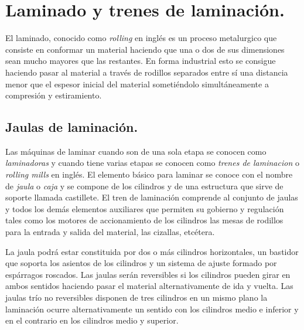 
\chapter{Laminado y trenes de laminación.} %

\label{AppendixLaminacionYTrenes} %



El laminado, conocido como \textit{rolling} en inglés es un proceso metalurgico que consiste en conformar un material haciendo que una o dos de sus dimensiones sean mucho mayores que las restantes. En forma industrial esto se consigue haciendo pasar al material a través de  rodillos separados entre sí una distancia menor que el espesor inicial del material sometiéndolo simultáneamente a compresión y estiramiento. 


\section{Jaulas de laminación.}

Las máquinas de laminar cuando son de una sola etapa se conocen como \emph{laminadoras} y cuando tiene varias etapas se conocen como \emph{trenes de laminacion} o \textit{rolling mills} en inglés. El elemento básico para laminar se conoce con el nombre de \emph{jaula}  o \emph{caja} y se compone de los cilindros y de una estructura que sirve de soporte llamada castillete. El tren de laminación comprende al conjunto de jaulas y todos los demás elementos auxiliares que permiten su gobierno y regulación tales como los motores de accionamiento de los cilindros las mesas de rodillos para la entrada y salida del material, las cizallas, etcétera.



La jaula podrá estar constituida por dos o más cilindros horizontales, un bastidor que soporta los asientos de los cilindros y un sistema de ajuste formado por espárragos roscados. Las jaulas serán reversibles si los cilindros pueden girar en ambos sentidos haciendo pasar el material alternativamente de ida y vuelta. Las jaulas trío no reversibles disponen de tres cilindros en un mismo plano la laminación ocurre alternativamente un sentido con los cilindros medio e inferior y en el contrario en los cilindros medio y superior.

